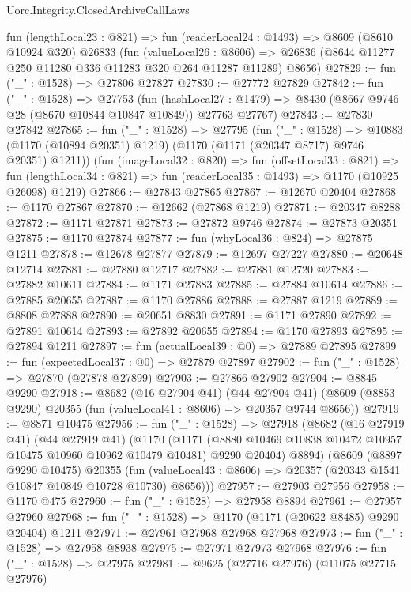 \begin{lexlean}{Uorc.Integrity.ClosedArchiveCallLaws}
\begin{coremodule}
  fun (lengthLocal23 : @821) =>
  fun (readerLocal24 : @1493) =>
  @8609
    (@8610 @10924 @320)
    @26833
    (fun (valueLocal26 : @8606) =>
    @26836 (@8644 @11277 @250 @11280 @336 @11283 @320 @264 @11287 @11289) @8656)
@27829 := fun ("_" : @1528) => @27806 @27827
@27830 := @27772 @27829
@27842 := fun ("_" : @1528) =>
  @27753
    (fun (hashLocal27 : @1479) =>
    @8430 (@8667 @9746 @28 (@8670 @10844 @10847 @10849)) @27763 @27767)
@27843 := @27830 @27842
@27865 := fun ("_" : @1528) =>
  @27795
    (fun ("_" : @1528) =>
    @10883 (@1170 (@10894 @20351) @1219) (@1170 (@1171 (@20347 @8717) @9746 @20351) @1211))
    (fun (imageLocal32 : @820) =>
    fun (offsetLocal33 : @821) =>
    fun (lengthLocal34 : @821) => fun (readerLocal35 : @1493) => @1170 (@10925 @26098) @1219)
@27866 := @27843 @27865
@27867 := @12670 @20404
@27868 := @1170 @27867
@27870 := @12662 (@27868 @1219)
@27871 := @20347 @8288
@27872 := @1171 @27871
@27873 := @27872 @9746
@27874 := @27873 @20351
@27875 := @1170 @27874
@27877 := fun (whyLocal36 : @824) => @27875 @1211
@27878 := @12678 @27877
@27879 := @12697 @27227
@27880 := @20648 @12714
@27881 := @27880 @12717
@27882 := @27881 @12720
@27883 := @27882 @10611
@27884 := @1171 @27883
@27885 := @27884 @10614
@27886 := @27885 @20655
@27887 := @1170 @27886
@27888 := @27887 @1219
@27889 := @8808 @27888
@27890 := @20651 @8830
@27891 := @1171 @27890
@27892 := @27891 @10614
@27893 := @27892 @20655
@27894 := @1170 @27893
@27895 := @27894 @1211
@27897 := fun (actualLocal39 : @0) => @27889 @27895
@27899 := fun (expectedLocal37 : @0) => @27879 @27897
@27902 := fun ("_" : @1528) => @27870 (@27878 @27899)
@27903 := @27866 @27902
@27904 := @8845 @9290
@27918 := @8682
    (@16 @27904 @41)
    (@44 @27904 @41)
    (@8609 (@8853 @9290) @20355 (fun (valueLocal41 : @8606) => @20357 @9744 @8656))
@27919 := @8871 @10475
@27956 := fun ("_" : @1528) =>
  @27918
    (@8682
      (@16 @27919 @41)
      (@44 @27919 @41)
      (@1170
        (@1171 (@8880 @10469 @10838 @10472 @10957 @10475 @10960 @10962 @10479 @10481) @9290 @20404)
        @8894)
      (@8609
        (@8897 @9290 @10475)
        @20355
        (fun (valueLocal43 : @8606) => @20357 (@20343 @1541 @10847 @10849 @10728 @10730) @8656)))
@27957 := @27903 @27956
@27958 := @1170 @475
@27960 := fun ("_" : @1528) => @27958 @8894
@27961 := @27957 @27960
@27968 := fun ("_" : @1528) => @1170 (@1171 (@20622 @8485) @9290 @20404) @1211
@27971 := @27961 @27968 @27968 @27968
@27973 := fun ("_" : @1528) => @27958 @8938
@27975 := @27971 @27973 @27968
@27976 := fun ("_" : @1528) => @27975
@27981 := @9625 (@27716 @27976) (@11075 @27715 @27976)

\end{coremodule}
\end{lexlean}
